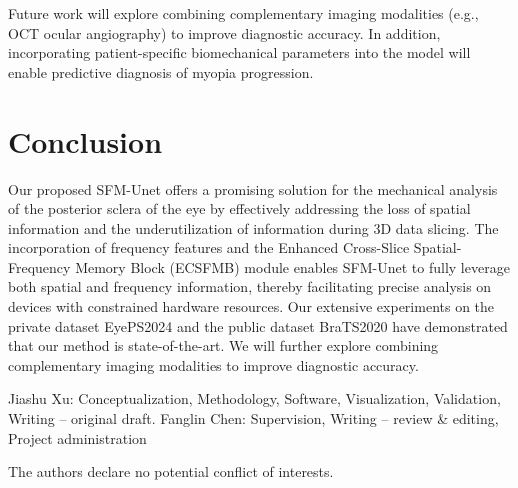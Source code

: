 \documentclass[AMA,Times1COL]{WileyNJDv5} %
\begin{document}
Future work will explore combining complementary imaging modalities (e.g., OCT ocular angiography) to improve diagnostic accuracy. In addition, incorporating patient-specific biomechanical parameters into the model will enable predictive diagnosis of myopia progression.

\section{Conclusion}
Our proposed SFM-Unet offers a promising solution for the mechanical analysis of the posterior sclera of the eye by effectively addressing the loss of spatial information and the underutilization of information during 3D data slicing. The incorporation of frequency features and the Enhanced Cross-Slice Spatial-Frequency Memory Block (ECSFMB) module enables SFM-Unet to fully leverage both spatial and frequency information, thereby facilitating precise analysis on devices with constrained hardware resources. Our extensive experiments on the private dataset EyePS2024 and the public dataset BraTS2020 have demonstrated that our method is state-of-the-art. We will further explore combining complementary imaging modalities to improve diagnostic accuracy. %



{}
Jiashu Xu: Conceptualization, Methodology, Software, Visualization, Validation, Writing – original draft. Fanglin Chen: Supervision, Writing – review \& editing, Project administration

The authors declare no potential conflict of interests.









\end{document}
